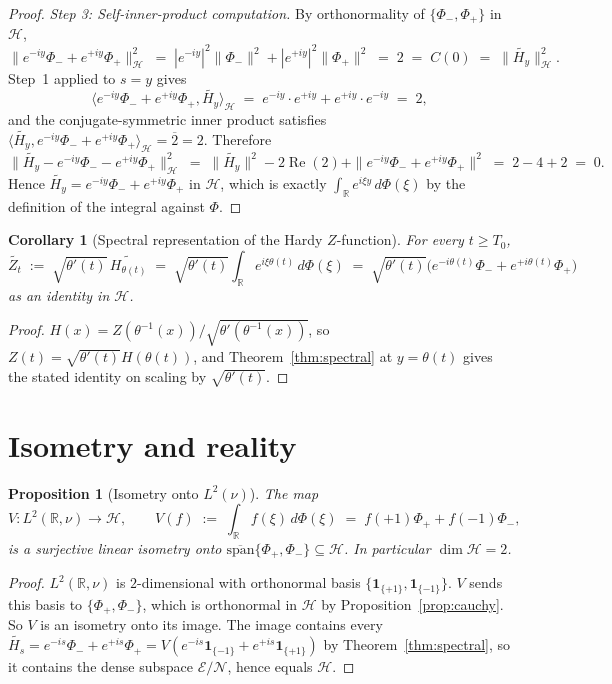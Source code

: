 \documentclass[11pt]{article}
\newtheorem{proposition}[theorem]{Proposition}
\newtheorem{corollary}[theorem]{Corollary}
\theoremstyle{definition}
\theoremstyle{remark}
\DeclareMathOperator{\ReOp}{Re}
\let\Re\ReOp
\begin{document}
\begin{proof}
\emph{Step 3: Self-inner-product computation.} By orthonormality of $\{\Phi_-,\Phi_+\}$ in $\mathcal{H}$,
\[
  \|e^{-iy}\Phi_-+e^{+iy}\Phi_+\|_\mathcal{H}^2\;=\;|e^{-iy}|^2\|\Phi_-\|^2+|e^{+iy}|^2\|\Phi_+\|^2\;=\;2\;=\;C(0)\;=\;\|\widetilde{H_y}\|_\mathcal{H}^2.
\]
Step~1 applied to $s=y$ gives
\[
  \langle e^{-iy}\Phi_-+e^{+iy}\Phi_+,\widetilde{H_y}\rangle_\mathcal{H}\;=\;e^{-iy}\cdot e^{+iy}+e^{+iy}\cdot e^{-iy}\;=\;2,
\]
and the conjugate-symmetric inner product satisfies $\langle\widetilde{H_y},e^{-iy}\Phi_-+e^{+iy}\Phi_+\rangle_\mathcal{H}=\overline{2}=2$. Therefore
\[
  \|\widetilde{H_y}-e^{-iy}\Phi_--e^{+iy}\Phi_+\|_\mathcal{H}^2\;=\;\|\widetilde{H_y}\|^2-2\Re(2)+\|e^{-iy}\Phi_-+e^{+iy}\Phi_+\|^2\;=\;2-4+2\;=\;0.
\]
Hence $\widetilde{H_y}=e^{-iy}\Phi_-+e^{+iy}\Phi_+$ in $\mathcal{H}$, which is exactly $\int_{\mathbb{R}}e^{i\xi y}\,d\Phi(\xi)$ by the definition of the integral against $\Phi$.
\end{proof}

\begin{corollary}[Spectral representation of the Hardy $Z$-function]\label{cor:Z}
For every $t\ge T_0$,
\[
  \widetilde{Z_t}\;:=\;\sqrt{\theta'(t)}\,\widetilde{H_{\theta(t)}}\;=\;\sqrt{\theta'(t)}\int_{\mathbb{R}} e^{i\xi\theta(t)}\,d\Phi(\xi)\;=\;\sqrt{\theta'(t)}\bigl(e^{-i\theta(t)}\Phi_-+e^{+i\theta(t)}\Phi_+\bigr)
\]
as an identity in $\mathcal{H}$.
\end{corollary}

\begin{proof}
$H(x)=Z(\theta^{-1}(x))/\sqrt{\theta'(\theta^{-1}(x))}$, so $Z(t)=\sqrt{\theta'(t)}H(\theta(t))$, and Theorem~\ref{thm:spectral} at $y=\theta(t)$ gives the stated identity on scaling by $\sqrt{\theta'(t)}$.
\end{proof}

\section{Isometry and reality}\label{sec:isometry}

\begin{proposition}[Isometry onto $L^2(\nu)$]\label{prop:isometry}
The map
\[
  V:L^2(\mathbb{R},\nu)\longrightarrow\mathcal{H},\qquad V(f)\;:=\;\int_{\mathbb{R}} f(\xi)\,d\Phi(\xi)\;=\;f(+1)\Phi_++f(-1)\Phi_-,
\]
is a surjective linear isometry onto $\overline{\mathrm{span}}\{\Phi_+,\Phi_-\}\subseteq\mathcal{H}$. In particular $\dim\mathcal{H}=2$.
\end{proposition}

\begin{proof}
$L^2(\mathbb{R},\nu)$ is $2$-dimensional with orthonormal basis $\{\mathbf{1}_{\{+1\}},\mathbf{1}_{\{-1\}}\}$. $V$ sends this basis to $\{\Phi_+,\Phi_-\}$, which is orthonormal in $\mathcal{H}$ by Proposition~\ref{prop:cauchy}. So $V$ is an isometry onto its image. The image contains every $\widetilde{H_s}=e^{-is}\Phi_-+e^{+is}\Phi_+=V(e^{-is}\mathbf{1}_{\{-1\}}+e^{+is}\mathbf{1}_{\{+1\}})$ by Theorem~\ref{thm:spectral}, so it contains the dense subspace $\mathcal{E}/\mathcal{N}$, hence equals $\mathcal{H}$.
\end{proof}
\end{document}
